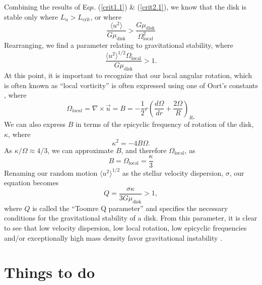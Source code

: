 \documentclass[aps,pra,twocolumn]{revtex4-1}
\begin{document}
Combining the results of Eqs. (\ref{crit1.1}) \& (\ref{crit2.1}), we know that the disk is stable only where $L_u > L_\text{crit}$, or where
\begin{equation}
\frac{\langle u^2 \rangle}{G\mu_\text{disk}} > \frac{G \mu_\text{disk}}{\Omega_\text{local}^2} \nonumber
\end{equation}
Rearranging, we find a parameter relating to gravitational stability, where \cite{whittle2010}
\begin{equation}
\frac{\langle u^2 \rangle^{1/2} \Omega_\text{local}}{G\mu_\text{disk}} > 1.
\end{equation}
At this point, it is important to recognize that our local angular rotation, which is often known as ``local vorticity'' is often expressed using one of Oort's constants \cite{whittle2010}, where
\begin{equation}
\Omega_{local} = \nabla \times \vec{u} = B = -\frac{1}{2}r\left(\frac{d\Omega}{dr} + \frac{2\Omega}{R}  \right)_{R_*}
\end{equation}
We can also express $B$ in terms of the epicyclic frequency of rotation of the disk, $\kappa$, where \cite{whittle2010}
\begin{equation}
\kappa^2 = -4B\Omega.
\end{equation}
As $\kappa/\Omega \approx 4/3$, we can approximate $B$, and therefore $\Omega_\text{local}$, as
\begin{equation}
B = \Omega_\text{local} = \frac{\kappa}{3}
\end{equation}
Renaming our random motion $\langle u^2 \rangle ^{1/2}$ as the stellar velocity dispersion, $\sigma$, our equation becomes
\begin{equation}
Q = \frac{\sigma \kappa}{3G\mu_\text{disk}} > 1,
\end{equation}
where $Q$ is called the ``Toomre Q parameter'' and specifies the necessary conditions for the gravitational stability of a disk.  From this parameter, it is clear to see that low velocity dispersion, low local rotation, low epicyclic frequencies and/or exceptionally high mass density favor gravitational instability \cite{whittle2010}.

\section{Things to do}
\end{document}
